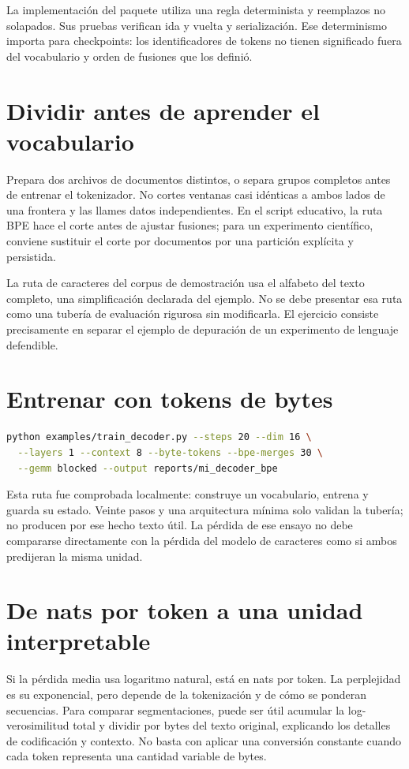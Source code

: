 \documentclass[12pt,a4paper,oneside]{report}
\begin{document}
La implementación del paquete utiliza una regla determinista y reemplazos no solapados. Sus pruebas verifican ida y vuelta y serialización. Ese determinismo importa para checkpoints: los identificadores de tokens no tienen significado fuera del vocabulario y orden de fusiones que los definió.

\section{Dividir antes de aprender el vocabulario}
Prepara dos archivos de documentos distintos, o separa grupos completos antes de entrenar el tokenizador. No cortes ventanas casi idénticas a ambos lados de una frontera y las llames datos independientes. En el script educativo, la ruta BPE hace el corte antes de ajustar fusiones; para un experimento científico, conviene sustituir el corte por documentos por una partición explícita y persistida.

La ruta de caracteres del corpus de demostración usa el alfabeto del texto completo, una simplificación declarada del ejemplo. No se debe presentar esa ruta como una tubería de evaluación rigurosa sin modificarla. El ejercicio consiste precisamente en separar el ejemplo de depuración de un experimento de lenguaje defendible.

\section{Entrenar con tokens de bytes}
\begin{lstlisting}[language=bash]
python examples/train_decoder.py --steps 20 --dim 16 \
  --layers 1 --context 8 --byte-tokens --bpe-merges 30 \
  --gemm blocked --output reports/mi_decoder_bpe
\end{lstlisting}
Esta ruta fue comprobada localmente: construye un vocabulario, entrena y guarda su estado. Veinte pasos y una arquitectura mínima solo validan la tubería; no producen por ese hecho texto útil. La pérdida de ese ensayo no debe compararse directamente con la pérdida del modelo de caracteres como si ambos predijeran la misma unidad.

\section{De nats por token a una unidad interpretable}
Si la pérdida media usa logaritmo natural, está en nats por token. La perplejidad es su exponencial, pero depende de la tokenización y de cómo se ponderan secuencias. Para comparar segmentaciones, puede ser útil acumular la log-verosimilitud total y dividir por bytes del texto original, explicando los detalles de codificación y contexto. No basta con aplicar una conversión constante cuando cada token representa una cantidad variable de bytes.
\end{document}
